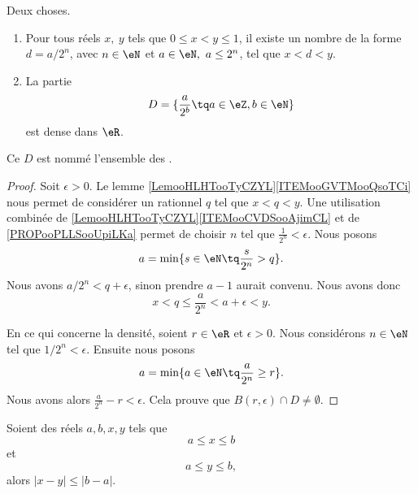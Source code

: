 \begin{corollary}    \label{CorDensiteDyadiques}
	Deux choses.
	\begin{enumerate}
		\item
		      Pour tous réels \(x,\ y\) tels que \( 0 \leq x < y \leq 1 \), il existe un nombre de la forme \( d = a / 2^n \), avec \( n \in \eN \) et \( a \in \eN,\ a \leq 2^n\), tel que \( x < d < y \).
		\item
		      La partie
		      \begin{equation}
			      D=\{ \frac{ a }{ 2^b }\tq a\in \eZ,b\in \eN \}
		      \end{equation}
		      est dense dans \( \eR\).
	\end{enumerate}
	Ce \( D\) est nommé l'ensemble des .
\end{corollary}

\begin{proof}
	Soit \( \epsilon>0\). Le lemme \ref{LemooHLHTooTyCZYL}\ref{ITEMooGVTMooQsoTCi} nous permet de considérer un rationnel \( q\) tel que \( x<q<y\). Une utilisation combinée de \ref{LemooHLHTooTyCZYL}\ref{ITEMooCVDSooAjimCL} et de \ref{PROPooPLLSooUpiLKa} permet de choisir \( n\) tel que \( \frac{1}{ 2^n}<\epsilon\). Nous posons
	\begin{equation}
		a=\min\{ s\in \eN\tq \frac{ s }{ 2^n }>q \}.
	\end{equation}
	Nous avons \( a/2^n<q+\epsilon\), sinon prendre \( a-1\) aurait convenu. Nous avons donc
	\begin{equation}
		x<q\leq \frac{ a }{ 2^n }<a+\epsilon<y.
	\end{equation}

	En ce qui concerne la densité, soient \( r\in \eR\) et \( \epsilon>0\). Nous considérons \( n\in \eN\) tel que \( 1/2^n<\epsilon\). Ensuite nous posons
	\begin{equation}
		a=\min\{ a\in \eN\tq \frac{ a }{ 2^n }\geq r \}.
	\end{equation}
	Nous avons alors \( \frac{ a }{ 2^n }-r<\epsilon\). Cela prouve que \( B(r,\epsilon)\cap D\neq\emptyset\).
\end{proof}


\begin{lemma}        \label{LEMooEGYLooCGrDrl}
	Soient des réels \( a,b,x,y\) tels que
	\begin{equation}
		a\leq x\leq b
	\end{equation}
	et
	\begin{equation}
		a\leq y\leq b,
	\end{equation}
	alors \( | x-y |\leq | b-a |\).
\end{lemma}


